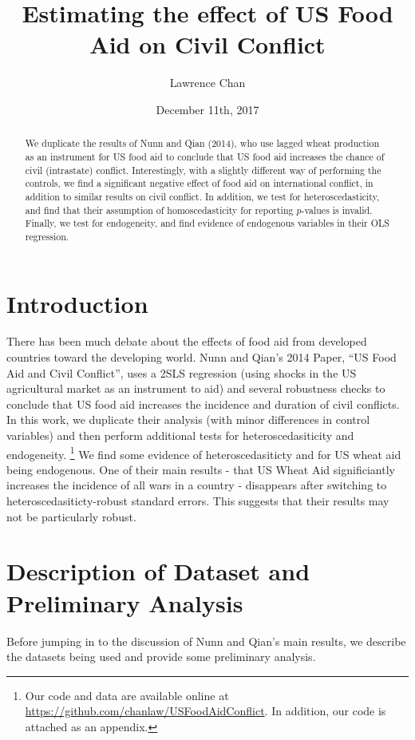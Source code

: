 \documentclass{article}
\title{Estimating the effect of US Food Aid on Civil Conflict}
\author{Lawrence Chan}
\date{December 11th, 2017}
\begin{document}
\maketitle
\begin{abstract}
We duplicate the results of Nunn and Qian (2014), who use lagged wheat production as an instrument for US food aid to conclude that US food aid increases the chance of civil (intrastate) conflict.  Interestingly, with a slightly different way of performing the controls, we find a significant negative effect of food aid on international conflict, in addition to similar results on civil conflict. In addition, we test for heteroscedasticity, and find that their assumption of homoscedasticity for reporting $p$-values is invalid. Finally, we test for endogeneity, and find evidence of endogenous variables in their OLS regression.
\end{abstract}
\section{Introduction}
There has been much debate about the effects of food aid from developed countries toward the developing world. Nunn and Qian's 2014 Paper, “US Food Aid and Civil Conflict”, uses a 2SLS regression (using shocks in the US agricultural market as an instrument to aid) and several robustness checks to conclude that US food aid increases the incidence and duration of civil conflicts.\\

In this work, we duplicate their analysis (with minor differences in control variables) and then perform additional tests for heteroscedasiticity and endogeneity. \footnote{Our code and data are available online at \href{https://github.com/chanlaw/USFoodAidConflict}{https://github.com/chanlaw/USFoodAidConflict}. In addition, our code is attached as an appendix. } We find some evidence of heteroscedasiticty and for US wheat aid being endogenous. One of their main results  - that US Wheat Aid significiantly increases the incidence of all wars in a country - disappears after switching to heteroscedasiticty-robust standard errors. This suggests that their results may not be particularly robust.

\section{Description of Dataset and Preliminary Analysis}
Before jumping in to the discussion of Nunn and Qian's main results, we describe the datasets being used and provide some preliminary analysis.\\
\end{document}
